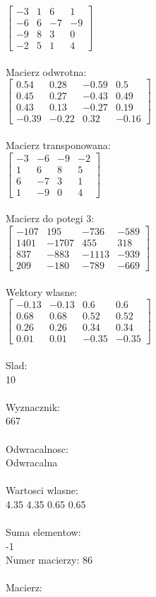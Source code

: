 \documentclass[a4paper,12pt]{article}
\begin{document}
$\begin{bmatrix} -3&1&6&1\\-6&6&-7&-9\\-9&8&3&0\\-2&5&1&4 \end{bmatrix}$
\\
\\
Macierz odwrotna:\\

$\begin{bmatrix} 0.54&0.28&-0.59&0.5\\0.45&0.27&-0.43&0.49\\0.43&0.13&-0.27&0.19\\-0.39&-0.22&0.32&-0.16 \end{bmatrix}$
\\
\\
Macierz transponowana:\\

$\begin{bmatrix} -3&-6&-9&-2\\1&6&8&5\\6&-7&3&1\\1&-9&0&4 \end{bmatrix}$
\\
\\
Macierz do potegi 3:\\

$\begin{bmatrix} -107&195&-736&-589\\1401&-1707&455&318\\837&-883&-1113&-939\\209&-180&-789&-669 \end{bmatrix}$
\\
\\
Wektory wlasne:\\

$\begin{bmatrix} -0.13&-0.13&0.6&0.6\\0.68&0.68&0.52&0.52\\0.26&0.26&0.34&0.34\\0.01&0.01&-0.35&-0.35 \end{bmatrix}$
\\
\\
Slad:\\
10
\\
\\
Wyznacznik:\\
667
\\
\\
Odwracalnosc:\\
Odwracalna
\\
\\
Wartosci wlasne:\\
4.35 4.35 0.65 0.65
\\
\\
Suma elementow:\\
-1
\\
\newpage
Numer macierzy:
86
\\
\\
Macierz:\\
\end{document}
